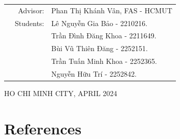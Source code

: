 \documentclass[12pt]{article}
\begin{document}
\begin{titlepage}
\begin{table}[h]
	\begin{tabular}{rrl}
		\hspace{5 cm} & Advisor: & Phan Thị Khánh Vân,\hspace*{5pt} FAS - HCMUT\\[6pt]
		& Students: & Lê Nguyễn Gia Bảo \hspace*{15pt} - 2210216. \\
		& 			& Trần Đình Đăng Khoa \hspace*{0pt} - 2211649. \\
		& 			& Bùi Vũ Thiên Đăng	  \hspace*{15pt} - 2252151. \\
		& 			& Trần Tuấn Minh Khoa 	  \hspace*{0pt} - 2252365. \\
		& 			& Nguyễn Hữu Trí		  \hspace*{33pt} - 2252842. \\
	\end{tabular}
\end{table}

\vspace*{1cm}

\begin{center}
{\footnotesize HO CHI MINH CITY, APRIL 2024}
\end{center}
\end{titlepage}


\newpage
\tableofcontents

% 







\clearpage
\section{References}


\nocite{*}
\end{document}
